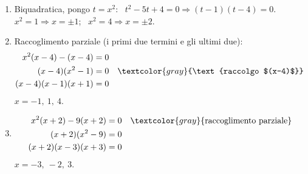 \begin{question}[ID=4.3, subtitle={Equazioni di grado superiore al secondo mediante scomposizione}, difficulty=media, tags={equazioni di grado superiore}]
\begin{explanation}
\begin{enumerate}
\[\begin{aligned}
    x^2(x^2-2x-8) &= 0 && \textcolor{gray}{\text{raccolgo $x^2$}}\\
    x^2(x-4)(x+2) &= 0 && \textcolor{gray}{\text{somma $-2$, prodotto $-8$}}
    \end{aligned}\]
    $x=-2,\ 0,\ 4$.
    \item Biquadratica, pongo $t=x^2$: \ $t^2-5t+4=0 \Rightarrow (t-1)(t-4)=0$. \\
    $x^2=1 \Rightarrow x=\pm1$; \ $x^2=4 \Rightarrow x=\pm2$.
    \item Raccoglimento parziale (i primi due termini e gli ultimi due):
    \[\begin{aligned}
    x^2(x-4)-(x-4) &= 0\\
    (x-4)(x^2-1) &= 0 && \textcolor{gray}{\text{raccolgo $(x-4)$}}\\
    (x-4)(x-1)(x+1) &= 0
    \end{aligned}\]
    $x=-1,\ 1,\ 4$.
    \item \[\begin{aligned}
    x^2(x+2)-9(x+2) &= 0 && \textcolor{gray}{\text{raccoglimento parziale}}\\
    (x+2)(x^2-9) &= 0\\
    (x+2)(x-3)(x+3) &= 0
    \end{aligned}\]
    $x=-3,\ -2,\ 3$.
\end{enumerate}
\end{explanation}
\end{question}


